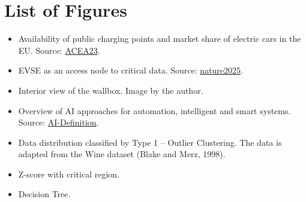 \lhead{}
\section*{List of Figures}

\begin{itemize}

  \item[Figure \ref{fig:chargingPointsInfrastructure}:] Availability of public charging points and market share of electric cars in the EU. Source: \href{https://www.acea.auto/figure/interactive-map-correlation-between-electric-car-sales-and-charging-point-availability-2023-data/}{ACEA23}.
  
  \item[Figure \ref{fig:EVSE_attackpoints}:] EVSE as an access node to critical data. Source: \href{https://www.nature.com/articles/s41598-025-00400-z#Fig7}{nature2025}.
  
  \item[Figure \ref{fig:Wallbox}:] Interior view of the wallbox. Image by the author.
  
  \item[Figure \ref{fig:AI_approaches}:] Overview of AI approaches for automation, intelligent and smart systems. Source: \href{https://www.ncbi.nlm.nih.gov/pmc/articles/PMC8830986/figure/Fig2/}{AI-Definition}.
  
  \item[Figure \ref{fig:outlier_clustering_type1}:] Data distribution classified by Type 1 – Outlier Clustering. The data is adapted from the Wine dataset (Blake and Merz, 1998)\cite{paper_HodgeAustin}.
  
  \item[Figure \ref{fig:z_score}:] Z-score with critical region\cite{paper_IJITEE_z_score}.

  \item[Figure \ref{fig:decision_tree}] Decision Tree\cite{decision_tree_explain}. 

\end{itemize}

\pagebreak
